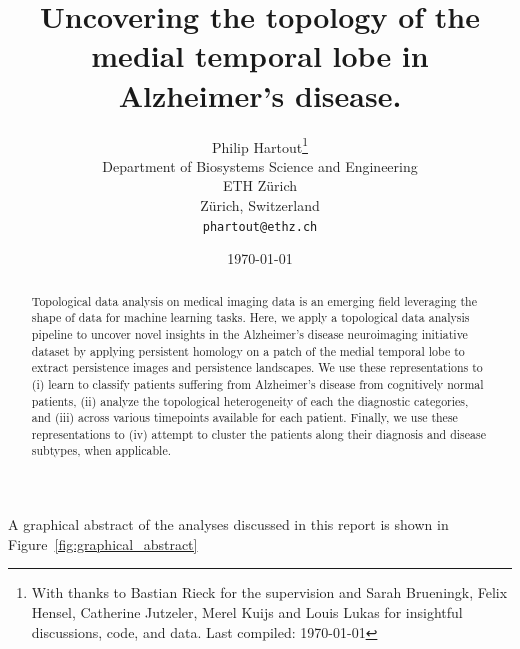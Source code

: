 \documentclass{article}
\title{Uncovering the topology of the medial temporal lobe in Alzheimer's disease.}
\author{%
  Philip Hartout\thanks{With thanks to Bastian Rieck for the supervision and Sarah Brueningk, Felix Hensel, Catherine Jutzeler, Merel Kuijs and Louis Lukas for insightful discussions, code, and data. Last compiled: \today}\\
  Department of Biosystems Science and Engineering\\
  ETH Zürich\\
  Zürich, Switzerland \\
  \texttt{phartout@ethz.ch} \\
}
\date{\today}
\begin{document}
\maketitle

\begin{abstract}
Topological data analysis on medical imaging data is an emerging field leveraging the shape of data for machine learning tasks. Here, we apply a topological data analysis pipeline to uncover novel insights in the Alzheimer's disease neuroimaging initiative dataset by applying persistent homology on a patch of the medial temporal lobe to extract persistence images and persistence landscapes. We use these representations to (i) learn to classify patients suffering from Alzheimer's disease from cognitively normal patients, (ii) analyze the topological heterogeneity of each the diagnostic categories, and (iii) across various timepoints available for each patient. Finally, we use these representations to (iv) attempt to cluster the patients along their diagnosis and disease subtypes, when applicable.
\end{abstract}

A graphical abstract of the analyses discussed in this report is shown in Figure~\ref{fig:graphical_abstract}
\end{document}
